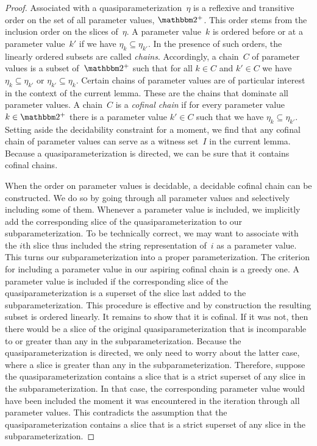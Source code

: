 \begin{proof}
  Associated with a quasiparameterization~$\eta$ is a reflexive and transitive order on the set of all parameter values, $\binary^+$.
  This order stems from the inclusion order on the slices of~$\eta$.
  A parameter value~$k$ is ordered before or at a parameter value~$k'$ if we have $\eta_k \subseteq \eta_{k'}$.
  In the presence of such orders, the linearly ordered subsets are called \emph{chains}.
  Accordingly, a chain~$C$ of parameter values is a subset of~$\binary^+$ such that for all $k \in C$ and $k' \in C$ we have $\eta_k \subseteq \eta_{k'}$ or $\eta_{k'} \subseteq \eta_k$.
  Certain chains of parameter values are of particular interest in the context of the current lemma.
  These are the chains that dominate all parameter values.
  A chain~$C$ is a \emph{cofinal chain} \parencite{abramsky1994domain} if for every parameter value $k \in \binary^+$ there is a parameter value $k' \in C$ such that we have $\eta_{k} \subseteq \eta_{k'}$.
  Setting aside the decidability constraint for a moment, we find that any cofinal chain of parameter values can serve as a witness set~$I$ in the current lemma.
  Because a quasiparameterization is directed, we can be sure that it contains cofinal chains.

  When the order on parameter values is decidable, a decidable cofinal chain can be constructed.
  We do so by going through all parameter values and selectively including some of them.
  Whenever a parameter value is included, we implicitly add the corresponding slice of the quasiparameterization to our subparameterization.
  To be technically correct, we may want to associate with the $i$th slice thus included the string representation of~$i$ as a parameter value.
  This turns our subparameterization into a proper parameterization.
  The criterion for including a parameter value in our aspiring cofinal chain is a greedy one.
  A parameter value is included if the corresponding slice of the quasiparameterization is a superset of the slice last added to the subparameterization.
  This procedure is effective and by construction the resulting subset is ordered linearly.
  It remains to show that it is cofinal.
  If it was not, then there would be a slice of the original quasiparameterization that is incomparable to or greater than any in the subparameterization.
  Because the quasiparameterization is directed, we only need to worry about the latter case, where a slice is greater than any in the subparameterization.
  Therefore, suppose the quasiparameterization contains a slice that is a strict superset of any slice in the subparameterization.
  In that case, the corresponding parameter value would have been included the moment it was encountered in the iteration through all parameter values.
  This contradicts the assumption that the quasiparameterization contains a slice that is a strict superset of any slice in the subparameterization.
\end{proof}

